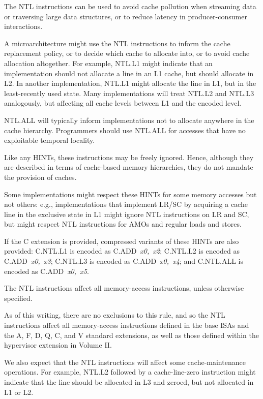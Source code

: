 \begin{commentary}
The NTL instructions can be used to avoid cache pollution when streaming data
or traversing large data structures, or to reduce latency in producer-consumer
interactions.

A microarchitecture might use the NTL instructions to inform the cache
replacement policy, or to decide which cache to allocate into, or to avoid
cache allocation altogether.
For example, NTL.L1 might indicate that an implementation should not allocate
a line in an L1 cache, but should allocate in L2.
In another implementation, NTL.L1 might allocate the line in L1, but in
the least-recently used state.
Many implementations will treat NTL.L2 and NTL.L3 analogously, but affecting
all cache levels between L1 and the encoded level.

NTL.ALL will typically inform implementations not to allocate anywhere in the
cache hierarchy.
Programmers should use NTL.ALL for accesses that have no exploitable temporal
locality.

Like any HINTs, these instructions may be freely ignored.
Hence, although they are described in terms of cache-based memory hierarchies,
they do not mandate the provision of caches.

Some implementations might respect these HINTs for some memory accesses but
not others: e.g., implementations that implement LR/SC by acquiring a
cache line in the exclusive state in L1 might ignore NTL instructions
on LR and SC, but might respect NTL instructions for
AMOs and regular loads and stores.
\end{commentary}

If the C extension is provided, compressed variants of these HINTs are also
provided:
C.NTL.L1 is encoded as \mbox{C.ADD {\em x0, x2}};
C.NTL.L2 is encoded as \mbox{C.ADD {\em x0, x3}};
C.NTL.L3 is encoded as \mbox{C.ADD {\em x0, x4}};
and C.NTL.ALL is encoded as \mbox{C.ADD {\em x0, x5}}.

The NTL instructions affect all memory-access instructions, unless otherwise
specified.

\begin{commentary}
As of this writing, there are no exclusions to this rule, and so
the NTL instructions affect all memory-access instructions
defined in the base ISAs and the A, F, D, Q, C, and V standard extensions,
as well as those defined within the hypervisor extension in Volume II.

We also expect that the NTL instructions will affect some cache-maintenance
operations.
For example, NTL.L2 followed by a cache-line-zero instruction might indicate
that the line should be allocated in L3 and zeroed, but not allocated in
L1 or L2.
\end{commentary}

